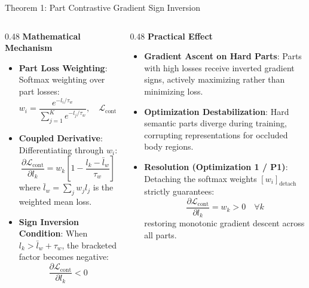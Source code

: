\documentclass[aspectratio=169,xcolor=dvipsnames]{beamer}
\begin{document}
\begin{frame}{Theorem 1: Part Contrastive Gradient Sign Inversion}
\footnotesize
\begin{columns}[t,onlytextwidth]
\begin{column}{0.48\textwidth}
    \textbf{Mathematical Mechanism}
    \begin{itemize}
        \setlength{\itemsep}{0.25em}
        \item \textbf{Part Loss Weighting}: Softmax weighting over part losses:
        $$w_i = \frac{e^{-l_i / \tau_w}}{\sum_{j=1}^K e^{-l_j / \tau_w}}, \quad \mathcal{L}_{\text{cont}} = \sum_{i=1}^K w_i l_i$$
        \item \textbf{Coupled Derivative}: Differentiating through $w_i$:
        $$\frac{\partial \mathcal{L}_{\text{cont}}}{\partial l_k} = w_k \left[ 1 - \frac{l_k - \bar{l}_w}{\tau_w} \right]$$
        where $\bar{l}_w = \sum_j w_j l_j$ is the weighted mean loss.
        \item \textbf{Sign Inversion Condition}: When $l_k > \bar{l}_w + \tau_w$, the bracketed factor becomes negative:
        $$\frac{\partial \mathcal{L}_{\text{cont}}}{\partial l_k} < 0$$
    \end{itemize}
\end{column}
\begin{column}{0.48\textwidth}
    \textbf{Practical Effect}
    \begin{itemize}
        \setlength{\itemsep}{0.25em}
        \item \textbf{Gradient Ascent on Hard Parts}: Parts with high losses receive inverted gradient signs, actively maximizing rather than minimizing loss.
        \item \textbf{Optimization Destabilization}: Hard semantic parts diverge during training, corrupting representations for occluded body regions.
        \item \textbf{Resolution (Optimization 1 / P1)}: Detaching the softmax weights $\left[ w_i \right]_{\text{detach}}$ strictly guarantees:
        $$\frac{\partial \mathcal{L}_{\text{cont}}}{\partial l_k} = w_k > 0 \quad \forall k$$
        restoring monotonic gradient descent across all parts.
    \end{itemize}
\end{column}
\end{columns}
\end{frame}
\end{document}
